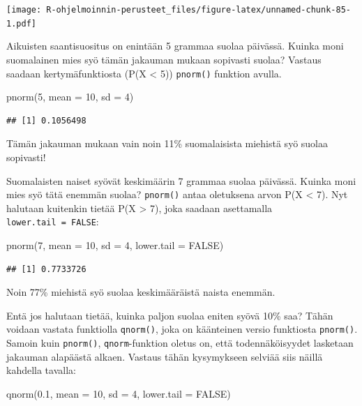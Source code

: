 \documentclass[
]{book}
\newenvironment{Shaded}{\begin{snugshade}}{\end{snugshade}}
\newcommand{\AttributeTok}[1]{\textcolor[rgb]{0.77,0.63,0.00}{#1}}
\newcommand{\ConstantTok}[1]{\textcolor[rgb]{0.00,0.00,0.00}{#1}}
\newcommand{\DecValTok}[1]{\textcolor[rgb]{0.00,0.00,0.81}{#1}}
\newcommand{\FloatTok}[1]{\textcolor[rgb]{0.00,0.00,0.81}{#1}}
\newcommand{\FunctionTok}[1]{\textcolor[rgb]{0.00,0.00,0.00}{#1}}
\newcommand{\NormalTok}[1]{#1}
\begin{document}
\texttt{[image: R-ohjelmoinnin-perusteet\_files/figure-latex/unnamed-chunk-85-1.pdf]}

Aikuisten saantisuositus on enintään 5 grammaa suolaa päivässä. Kuinka moni suomalainen mies syö tämän jakauman mukaan sopivasti suolaa? Vastaus saadaan kertymäfunktiosta (P(X \textless{} 5)) \texttt{pnorm()} funktion avulla.

\begin{Shaded}
\begin{Highlighting}[]
\FunctionTok{pnorm}\NormalTok{(}\DecValTok{5}\NormalTok{, }\AttributeTok{mean =} \DecValTok{10}\NormalTok{, }\AttributeTok{sd =} \DecValTok{4}\NormalTok{)}
\end{Highlighting}
\end{Shaded}

\begin{verbatim}
## [1] 0.1056498
\end{verbatim}

Tämän jakauman mukaan vain noin 11\% suomalaisista miehistä syö suolaa sopivasti!

Suomalaisten naiset syövät keskimäärin 7 grammaa suolaa päivässä. Kuinka moni mies syö tätä enemmän suolaa? \texttt{pnorm()} antaa oletuksena arvon P(X \textless{} 7). Nyt halutaan kuitenkin tietää P(X \textgreater{} 7), joka saadaan asettamalla \texttt{lower.tail\ =\ FALSE}:

\begin{Shaded}
\begin{Highlighting}[]
\FunctionTok{pnorm}\NormalTok{(}\DecValTok{7}\NormalTok{, }\AttributeTok{mean =} \DecValTok{10}\NormalTok{, }\AttributeTok{sd =} \DecValTok{4}\NormalTok{, }\AttributeTok{lower.tail =} \ConstantTok{FALSE}\NormalTok{)}
\end{Highlighting}
\end{Shaded}

\begin{verbatim}
## [1] 0.7733726
\end{verbatim}

Noin 77\% miehistä syö suolaa keskimääräistä naista enemmän.

Entä jos halutaan tietää, kuinka paljon suolaa eniten syövä 10\% saa? Tähän voidaan vastata funktiolla \texttt{qnorm()}, joka on käänteinen versio funktiosta \texttt{pnorm()}. Samoin kuin \texttt{pnorm()}, \texttt{qnorm}-funktion oletus on, että todennäköisyydet lasketaan jakauman alapäästä alkaen. Vastaus tähän kysymykseen selviää siis näillä kahdella tavalla:

\begin{Shaded}
\begin{Highlighting}[]
\FunctionTok{qnorm}\NormalTok{(}\FloatTok{0.1}\NormalTok{, }\AttributeTok{mean =} \DecValTok{10}\NormalTok{, }\AttributeTok{sd =} \DecValTok{4}\NormalTok{, }\AttributeTok{lower.tail =} \ConstantTok{FALSE}\NormalTok{)}
\end{Highlighting}
\end{Shaded}
\end{document}
